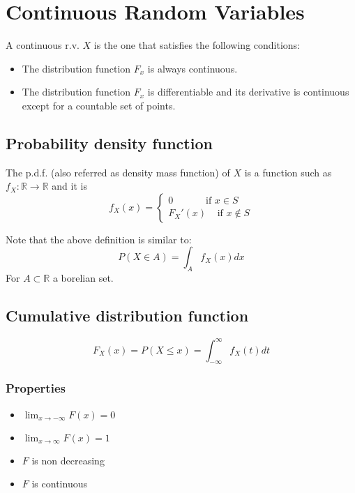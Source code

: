 \section{Continuous Random Variables}
A continuous r.v. $X$ is the one that satisfies the following conditions:
\begin{itemize}
    \item The distribution function $F_x$ is always continuous.
    \item The distribution function $F_x$ is differentiable and its derivative
    is continuous except for a countable set of points.
\end{itemize}

\subsection{Probability density function}
The p.d.f. (also referred as density mass function) of $X$ is a function such as
$f_X:\mathbb{R}\rightarrow\mathbb{R}$ and it is 
\[ 
f_X(x)=\begin{cases}
    0\;\;\;\;\;\;\;\;\;\;\;\; \text{if }x\in S\\
    F_X'(x)\;\;\;\; \text{if }x\notin S
\end{cases}    
\]

\begin{tcolorbox}
    Note that the above definition is similar to:
    \[ P(X\in A) = \int_A f_X(x)dx \] For $A\subset\mathbb{R}$ a borelian set.
\end{tcolorbox}


\subsection{Cumulative distribution function}
\[ F_X(x) = P(X\leq x) = \int_{-\infty}^\infty f_X(t)dt \]

\subsubsection{Properties}
\begin{itemize}
    \item $\lim_{x\rightarrow-\infty}F(x)=0$
    \item $\lim_{x\rightarrow\infty}F(x)=1$
    \item $F$ is non decreasing
    \item $F$ is continuous
\end{itemize}

